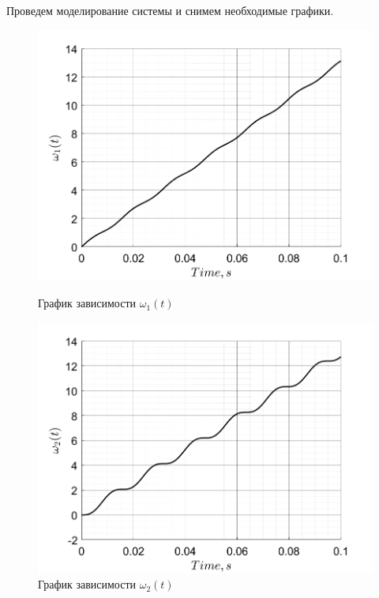 Проведем моделирование системы и снимем необходимые графики.
\begin{figure}[!h]
    \centering
    \begin{minipage}{0.5\textwidth}
        \centering
        \includegraphics[width = \textwidth]{img/model_omega1}
        \caption{График зависимости $\omega_1(t)$}
    \end{minipage}%
\begin{minipage}{0.5\textwidth}
        \centering
        \includegraphics[width = \textwidth]{img/model_omega2}
        \caption{График зависимости $\omega_2(t)$}
    \end{minipage}\label{fig:figure}%
\end{figure}

